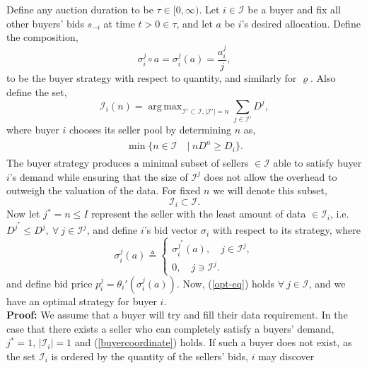 \documentclass[sigconf, anonymous]{acmart}
\newcommand{\mcI}{\mathcal{I}}
\newcommand{\g}{\sigma}
\DeclareMathOperator*{\argmax}{arg\,max}
\theoremstyle{definition}
\begin{document}
{
\label{buyerstrategy}
Define any auction duration to be $\tau \in [0,\infty)$. 
Let $i\in\mcI$ be a buyer and fix all other buyers' bids $s_{-i}$ at time
$t>0\in\tau$, and let $a$ be $i$'s desired allocation. 
Define the composition,
$$
     \g_i^j \circ a = \g_i^j(a) = \frac{a_i^j}{j},
$$
to be the buyer strategy with respect to quantity, and similarly for $\varrho$.
Also define the set,
$$
    \mcI_i(n) =\argmax_{\mcI' \subset \mcI, \vert\mcI'\vert =
n}\sum_{j\in\mcI'} D^j,
$$
where buyer $i$ chooses its seller pool by determining $n$ as,
\begin{align}
\begin{split}\label{buyercoordinate}
    \min\big\lbrace n \in \mcI \ &\vert \ n D^n\ge D_i \big\rbrace. 
\end{split}
\end{align} 
The buyer strategy produces a minimal subset of sellers $\in \mcI$ 
able to satisfy buyer $i$'s demand while ensuring that the size of $\mcI^j$
does not allow the overhead to outweigh the valuation of the data. For 
fixed $n$ we will denote this subset,
\begin{equation}\label{sellers}
    \mcI_i \subset \mcI.
\end{equation}  
Now let $j^* = n \le I$ represent the seller with the least amount of data
$\in\mcI_i$, i.e. $D^{j^*} \le D^j, \ \forall\ j \in\mcI^j$, and define $i$'s bid
vector $\g_i$ with respect to its strategy, where
\begin{equation}\label{opt-eq}
    \g_i^j(a) \triangleq \begin{cases} \g_i^{j^*}(a), \quad j\in\mcI^j,\\
            0, \quad j\ni\mcI^j.\end{cases}
\end{equation}
and define bid price $p_i^j = \theta_i'(\g_i^j(a))$.
Now, (\ref{opt-eq}) holds $\forall \ j\in\mcI$,
and we have an optimal strategy for buyer $i$.
}\\
\textbf{Proof:}
We assume that a buyer will try and fill their data requirement.
In the case that there exists a seller who can completely satisfy a buyers'
demand, $j^*=1$, $\vert \mcI_i\vert =1$ and (\ref{buyercoordinate}) holds. If such a buyer does not exist,
as the set $\mcI_i$ is ordered by the quantity of the sellers' bids, $i$ may discover 
\end{document}
